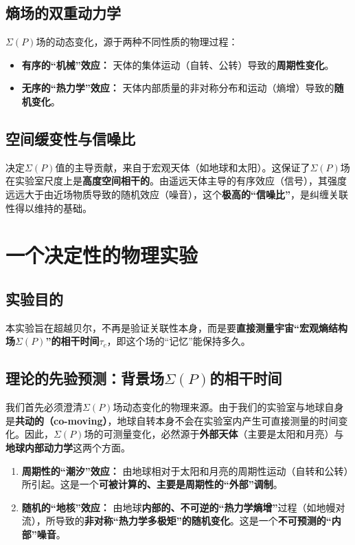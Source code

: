 \documentclass[12pt]{article}
\begin{document}
\subsection{熵场的双重动力学}
$\Sigma(P)$场的动态变化，源于两种不同性质的物理过程：
\begin{itemize}
    \item   \textbf{有序的``机械''效应：} 天体的集体运动（自转、公转）导致的\textbf{周期性变化}。
    \item   \textbf{无序的``热力学''效应：} 天体内部质量的非对称分布和运动（熵增）导致的\textbf{随机变化}。
\end{itemize}

\subsection{空间缓变性与信噪比}
决定$\Sigma(P)$值的主导贡献，来自于宏观天体（如地球和太阳）。这保证了$\Sigma(P)$场在实验室尺度上是\textbf{高度空间相干的}。由遥远天体主导的有序效应（信号），其强度远远大于由近场物质导致的随机效应（噪音），这个\textbf{极高的``信噪比''}，是纠缠关联性得以维持的基础。



\section{一个决定性的物理实验}

\subsection{实验目的}
本实验旨在超越贝尔，不再是验证关联性本身，而是要\textbf{直接测量宇宙``宏观熵结构场$\Sigma(P)$''的相干时间$\tau_c$}，即这个场的``记忆''能保持多久。

\subsection{理论的先验预测：背景场$\Sigma(P)$的相干时间}
我们首先必须澄清$\Sigma(P)$场动态变化的物理来源。由于我们的实验室与地球自身是\textbf{共动的（co-moving）}，地球自转本身不会在实验室内产生可直接测量的时间变化。因此，$\Sigma(P)$场的可测量变化，必然源于\textbf{外部天体}（主要是太阳和月亮）与\textbf{地球内部动力学}这两个方面。
\begin{enumerate}
    \item   \textbf{周期性的``潮汐''效应：} 由地球相对于太阳和月亮的周期性运动（自转和公转）所引起。这是一个\textbf{可被计算的、主要是周期性的``外部''调制}。
    \item   \textbf{随机的``地核''效应：} 由地球\textbf{内部的、不可逆的``热力学熵增''}过程（如地幔对流），所导致的\textbf{非对称``热力学多极矩''的随机变化}。这是一个\textbf{不可预测的``内部''噪音}。
\end{enumerate}
\end{document}
